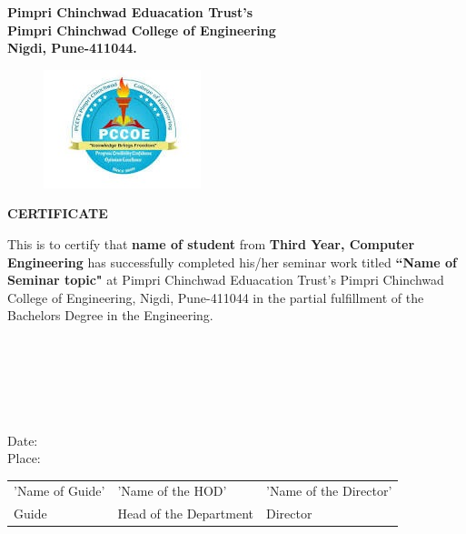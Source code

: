 \begin{center}
\textbf{{\large Pimpri Chinchwad Eduacation Trust's  }}\\
\textbf{{\large Pimpri Chinchwad College of Engineering }}\\
\textbf{{\large Nigdi, Pune-411044.}}\\



\begin{figure}[h]
\centerline{ \includegraphics[scale=0.8]{Logo.JPG}  }
\end{figure}
\vspace{0.1in}
{\large {\textbf{CERTIFICATE}}}\\
\end{center}
\noindent
This is to certify that \textbf{name of student} from \textbf{Third Year, Computer Engineering} has successfully completed his/her seminar work titled  \textbf{``Name of Seminar topic"}  at 
Pimpri Chinchwad Eduacation Trust's Pimpri Chinchwad College of Engineering, Nigdi, Pune-411044 in the partial fulfillment of the Bachelors Degree in the Engineering.\\
\\
\\
\\
\\
\\
\\
Date: \\
Place: \\
\begin{center}
 \begin{tabular}{p{2in} p{2.5in} p{2.5in}}
'Name of Guide' & 'Name of the HOD' & 'Name of  the Director'\\ 
Guide & Head of the Department & Director \\
\end{tabular}
\end{center} 
